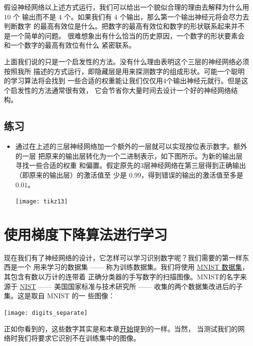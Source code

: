 假设神经网络以上述方式运行，我们可以给出一个貌似合理的理由去解释为什么用 $10$ 个
输出而不是 $4$ 个。如果我们有 $4$ 个输出，那么第一个输出神经元将会尽力去判断数字
的最高有效位是什么。把数字的最高有效位和数字的形状联系起来并不是一个简单的问题。
很难想象出有什么恰当的历史原因，一个数字的形状要素会和一个数字的最高有效位有什么
紧密联系。

上面我们说的只是一个启发性的方法。没有什么理由表明这个三层的神经网络必须按照我所
描述的方式运行，即隐藏层是用来探测数字的组成形状。可能一个聪明的学习算法将会找到
一些合适的权重能让我们仅仅用4个输出神经元就行。但是这个启发性的方法通常很有效，
它会节省你大量时间去设计一个好的神经网络结构。

\subsection*{练习}

\begin{itemize}
\item 通过在上述的三层神经网络加一个额外的一层就可以实现按位表示数字。额外的一层
  把原来的输出层转化为一个二进制表示，如下图所示。为新的输出层寻找一些合适的权重
  和偏置。假定原先的3层神经网络在第三层得到正确输出（即原来的输出层）的激活值至
  少是 $0.99$，得到错误的输出的激活值至多是 $0.01$。
  \begin{center}
    \texttt{[image: tikz13]}
  \end{center}
\end{itemize}

\section{使用梯度下降算法进行学习}
\label{sec:learning_with_gradient_descent}

现在我们有了神经网络的设计，它怎样可以学习识别数字呢？我们需要的第一样东西是一个
用来学习的数据集 —— 称为训练数据集。我们将使用
\href{http://yann.lecun.com/exdb/mnist/}{MNIST 数据集}，其包含有数以万计的连带着
正确分类器的手写数字的扫描图像。MNIST的名字来源于
\href{http://en.wikipedia.org/wiki/National_Institute_of_Standards_and_Technology}{NIST}
—— 美国国家标准与技术研究所 —— 收集的两个数据集改进后的子集。这是取自 MNIST 的一
些图像：
\begin{center}
  \texttt{[image: digits\_separate]}
\end{center}

正如你看到的，这些数字其实是和本章\hyperref[fig:digits]{开始}提到的一样。当然，
当测试我们的网络时我们将要求它识别不在训练集中的图像。


